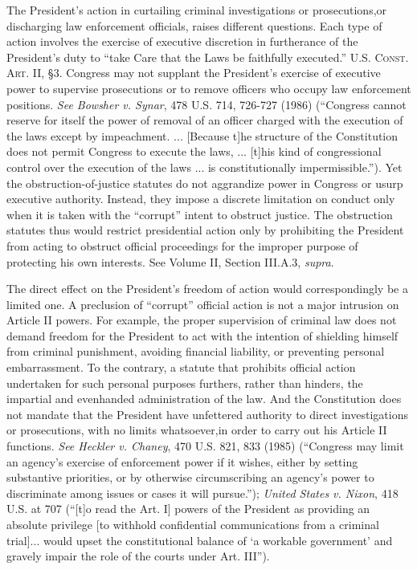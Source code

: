 The President’s action in curtailing criminal investigations or prosecutions,or discharging law enforcement officials, raises different questions.
Each type of action involves the exercise of executive discretion in furtherance of the President’s duty to “take Care that the Laws be faithfully executed.”
\textsc{U.S. Const. Art. II}, \S 3.
Congress may not supplant the President’s exercise of executive power to supervise prosecutions or to remove officers who occupy law enforcement positions.
\textit{See Bowsher v. Synar}, 478 U.S. 714, 726-727 (1986) (“Congress cannot reserve for itself the power of removal of an officer charged with the execution of the laws except by impeachment. ... [Because t]he structure of the Constitution does not permit Congress to execute the laws, ... [t]his kind of congressional control over the execution of the laws ... is constitutionally impermissible.”).
Yet the obstruction-of-justice statutes do not aggrandize power in Congress or usurp executive authority.
Instead, they impose a discrete limitation on conduct only when it is taken with the “corrupt” intent to obstruct justice.
The obstruction statutes thus would restrict presidential action only by prohibiting the President from acting to obstruct official proceedings for the improper purpose of protecting his own interests.
See Volume II, Section III.A.3, \textit{supra}.

The direct effect on the President’s freedom of action would correspondingly be a limited one.
A preclusion of “corrupt” official action is not a major intrusion on Article II powers.
For example, the proper supervision of criminal law does not demand freedom for the President to act with the intention of shielding himself from criminal punishment, avoiding financial liability, or preventing personal embarrassment.
To the contrary, a statute that prohibits official action undertaken for such personal purposes furthers, rather than hinders, the impartial and evenhanded administration of the law.
And the Constitution does not mandate that the President have unfettered authority to direct investigations or prosecutions, with no limits whatsoever,in order to carry out his Article II functions.
\textit{See Heckler v. Chaney}, 470 U.S. 821, 833 (1985) (“Congress may limit an agency’s exercise of enforcement power if it wishes, either by setting substantive priorities, or by otherwise circumscribing an agency’s power to discriminate among issues or cases it will pursue.”);
\textit{United States v. Nixon}, 418 U.S. at 707 (“[t]o read the Art. I] powers of the President as providing an absolute privilege [to withhold confidential communications from a criminal trial]... would upset the constitutional balance of ‘a workable government’ and gravely impair the role of the courts under Art. III”).


